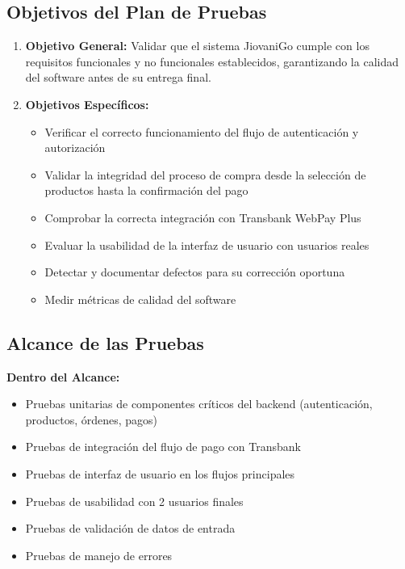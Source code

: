 \documentclass[12pt,a4paper]{article}
\begin{document}
\subsection{Objetivos del Plan de Pruebas}

\begin{enumerate}
    \item \textbf{Objetivo General:} Validar que el sistema JiovaniGo cumple con los requisitos funcionales y no funcionales establecidos, garantizando la calidad del software antes de su entrega final.

    \item \textbf{Objetivos Específicos:}
    \begin{itemize}
        \item Verificar el correcto funcionamiento del flujo de autenticación y autorización
        \item Validar la integridad del proceso de compra desde la selección de productos hasta la confirmación del pago
        \item Comprobar la correcta integración con Transbank WebPay Plus
        \item Evaluar la usabilidad de la interfaz de usuario con usuarios reales
        \item Detectar y documentar defectos para su corrección oportuna
        \item Medir métricas de calidad del software
    \end{itemize}
\end{enumerate}

\subsection{Alcance de las Pruebas}

\textbf{Dentro del Alcance:}
\begin{itemize}
    \item Pruebas unitarias de componentes críticos del backend (autenticación, productos, órdenes, pagos)
    \item Pruebas de integración del flujo de pago con Transbank
    \item Pruebas de interfaz de usuario en los flujos principales
    \item Pruebas de usabilidad con 2 usuarios finales
    \item Pruebas de validación de datos de entrada
    \item Pruebas de manejo de errores
\end{itemize}
\end{document}
